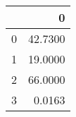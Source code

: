 \begin{tabular}{lr}
\toprule
{} &        0 \\
\midrule
0 &  42.7300 \\
1 &  19.0000 \\
2 &  66.0000 \\
3 &   0.0163 \\
\bottomrule
\end{tabular}
